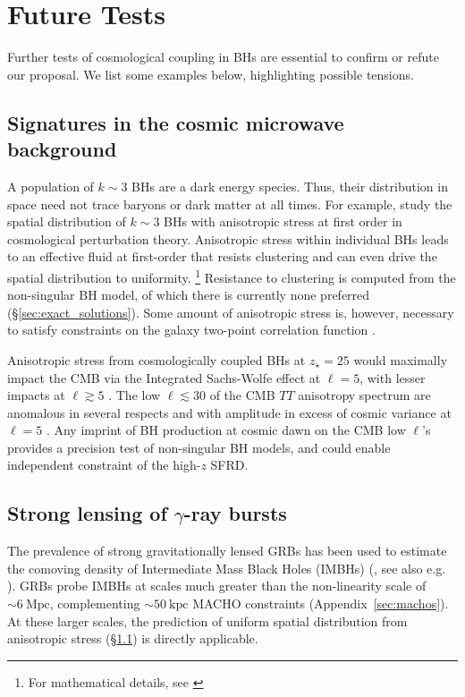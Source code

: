 \documentclass[twocolumn,twocolappendix]{aastex631}
\begin{document}
\section{Future Tests}
Further tests of cosmological coupling in BHs are essential to confirm or refute our proposal.
We list some examples below, highlighting possible tensions.


\subsection{Signatures in the cosmic microwave background}\label{sec:cmb}

A population of $k\sim 3$ BHs are a dark energy species.
Thus, their distribution in space need not trace baryons or dark matter at all times.
For example, \citet{croker2020implications} study the spatial distribution of $k \sim 3$ BHs with anisotropic stress \citep[e.g.][]{cattoen2005gravastars} at first order in cosmological perturbation theory.
Anisotropic stress within individual BHs leads to an effective fluid at first-order that resists clustering and can even drive the spatial distribution to uniformity.%
\footnote{
  For mathematical details, see \citet[][]{croker2022well}}
Resistance to clustering is computed from the non-singular BH model, of which there is currently none preferred (\S\ref{sec:exact_solutions}).
Some amount of anisotropic stress is, however, necessary to satisfy constraints on the galaxy two-point correlation function \citep{croker2020implications}.

Anisotropic stress from cosmologically coupled BHs at $z_\star = 25$ would maximally impact the CMB via the Integrated Sachs-Wolfe effect at $\ell = 5$, with lesser impacts at $\ell \gtrsim 5$ \citep[e.g.][]{koivisto2006dark,dodelsoncosmology2020}.
The low $\ell \lesssim 30$ of the CMB $TT$ anisotropy spectrum are anomalous in several respects \citep[e.g.][]{schwarzanomalies2016} and with amplitude in excess of cosmic variance at $\ell = 5$ \citep[e.g.][]{planck2018cmb}.
Any imprint of BH production at cosmic dawn on the CMB low $\ell$'s provides a precision test of non-singular BH models, and could enable independent constraint of the high-$z$ SFRD.

\subsection{Strong lensing of $\gamma$-ray bursts}
\label{sec:grbs}
The prevalence of strong gravitationally lensed GRBs has been used to estimate the comoving density of Intermediate Mass Black Holes (IMBHs) (\citealt{paynter21}, see also e.g. \citealt{wang21grav,yang21grav,chen22grav,lin22grav,kalan22,liao22rev}).
GRBs probe IMBHs at scales much greater than the non-linearity scale of $\sim 6~\mathrm{Mpc}$, complementing $\sim 50~\mathrm{kpc}$ MACHO constraints (Appendix~\ref{sec:machos}).
At these larger scales, the prediction of uniform spatial distribution from anisotropic stress (\S\ref{sec:cmb}) is directly applicable.
\end{document}
